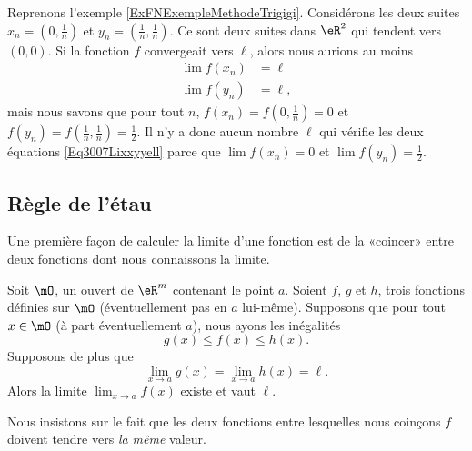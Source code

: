 \begin{example} \label{EXooNBTYooFyKRTB}
    Reprenons l'exemple \ref{ExFNExempleMethodeTrigigi}. Considérons les deux suites $x_n=(0,\frac{1}{ n })$ et $y_n=(\frac{1}{ n },\frac{1}{ n })$. Ce sont deux suites dans $\eR^2$ qui tendent vers $(0,0)$. Si la fonction $f$ convergeait vers $\ell$, alors nous aurions au moins
    \begin{subequations}\label{Eq3007Lixxyyell}
        \begin{align}
            \lim f(x_n)&=\ell\\
            \lim f(y_n)&=\ell,
        \end{align}
    \end{subequations}
    mais nous savons que pour tout $n$, $f(x_n)=f(0,\frac{1}{ n })=0$ et $f(y_n)=f(\frac{1}{ n },\frac{1}{ n })=\frac{1}{ 2 }$. Il n'y a donc aucun nombre $\ell$ qui vérifie les deux équations \eqref{Eq3007Lixxyyell} parce que $\lim f(x_n)=0$ et $\lim f(y_n)=\frac{ 1 }{2}$.
\end{example}

\subsection{Règle de l'étau}

Une première façon de calculer la limite d'une fonction est de la «coincer» entre deux fonctions dont nous connaissons la limite. 
\begin{theorem}		\label{ThoRegleEtau}
	Soit $\mO$, un ouvert de $\eR^m$ contenant le point $a$. Soient $f$, $g$ et $h$, trois fonctions définies sur $\mO$ (éventuellement pas en $a$ lui-même). Supposons que pour tout $x\in\mO$ (à part éventuellement $a$), nous ayons les inégalités
	\begin{equation}
		g(x)\leq f(x)\leq h(x).
	\end{equation}
	Supposons de plus que
	\begin{equation}
		\lim_{x\to a} g(x)=\lim_{x\to a} h(x)=\ell.
	\end{equation}
	Alors la limite $\lim_{x\to a} f(x)$ existe et vaut $\ell$.
\end{theorem}

Nous insistons sur le fait que les deux fonctions entre lesquelles nous coinçons $f$ doivent tendre vers \emph{la même} valeur.

